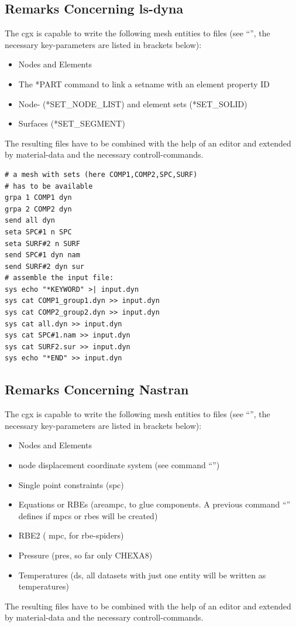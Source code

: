 \documentclass{article}
\begin{document}
\begin{appendix}
\subsection{\label{Remarks Concerning ls-dyna}Remarks Concerning ls-dyna}
The cgx is capable to write the following mesh entities to files (see ``'', the necessary key-parameters are listed in brackets below):
\begin{itemize}
\item Nodes and Elements 
\item The *PART command to link a setname with an element property ID 
\item Node- (*SET\_NODE\_LIST) and element sets (*SET\_SOLID)
\item Surfaces (*SET\_SEGMENT)
\end{itemize}
The resulting files have to be combined with the help of an editor and extended by material-data and the necessary controll-commands. 
\begin{verbatim}
# a mesh with sets (here COMP1,COMP2,SPC,SURF)
# has to be available
grpa 1 COMP1 dyn
grpa 2 COMP2 dyn
send all dyn
seta SPC#1 n SPC
seta SURF#2 n SURF
send SPC#1 dyn nam
send SURF#2 dyn sur
# assemble the input file:
sys echo "*KEYWORD" >| input.dyn
sys cat COMP1_group1.dyn >> input.dyn
sys cat COMP2_group2.dyn >> input.dyn
sys cat all.dyn >> input.dyn
sys cat SPC#1.nam >> input.dyn
sys cat SURF2.sur >> input.dyn
sys echo "*END" >> input.dyn
\end{verbatim}

\subsection{\label{Remarks Concerning Nastran}Remarks Concerning Nastran}
The cgx is capable to write the following mesh entities to files (see ``'', the necessary key-parameters are listed in brackets below):
\begin{itemize}
\item Nodes and Elements 
\item node displacement coordinate system (see command ``'')
\item Single point constraints (spc)
\item Equations or RBEs (areampc, to glue components. A previous command ``'' defines if mpcs or rbes will be created)
\item RBE2 ( mpc, for rbe-spiders)
\item Pressure (pres, so far only CHEXA8)
\item Temperatures (ds, all datasets with just one entity will be written as temperatures)
\end{itemize}
The resulting files have to be combined with the help of an editor and extended by material-data and the necessary controll-commands. 


\end{appendix}
\end{document}
